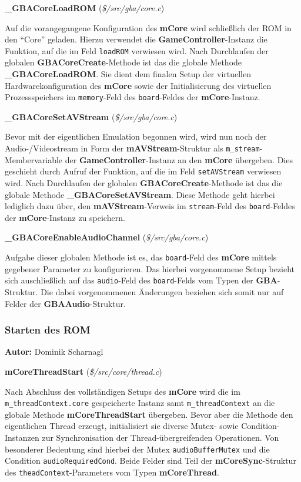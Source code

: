 \documentclass[11pt,a4paper]{scrartcl}
\newcommand{\AutorDominik} {
    \vspace{-4mm}
    \large \textbf{Autor:} Dominik Scharnagl \normalsize
    \vspace{2mm}
}
\newcommand{\paratitlecode}[2] {
    \vspace{5mm}
    \large \textbf{#1} \normalsize(\textit{\${#2}})
    \vspace{2mm}\newline
}
\begin{document}
\paratitlecode{{\_}GBACoreLoadROM}{/src/gba/core.c}
Auf die vorangegangene Konfiguration des \textbf{mCore} wird schlie{\ss}lich der ROM in den \enquote{Core} geladen. Hierzu verwendet die \textbf{GameController}-Instanz die Funktion, auf die im Feld \verb|loadROM| verwiesen wird. Nach Durchlaufen der globalen \textbf{GBACoreCreate}-Methode ist das die globale Methode \textbf{{\_}GBACoreLoadROM}. Sie dient dem finalen Setup der virtuellen Hardwarekonfiguration des \textbf{mCore} sowie der Initialisierung des virtuellen Prozessspeichers im \verb|memory|-Feld des \verb|board|-Feldes der \textbf{mCore}-Instanz.

\paratitlecode{{\_}GBACoreSetAVStream}{/src/gba/core.c}
Bevor mit der eigentlichen Emulation begonnen wird, wird nun noch der Audio-/Videostream in Form der \textbf{mAVStream}-Struktur als \verb|m_stream|-Membervariable der \textbf{GameController}-Instanz an den \textbf{mCore} \"ubergeben. Dies geschieht durch Aufruf der Funktion, auf die im Feld \verb|setAVStream| verwiesen wird. Nach Durchlaufen der globalen \textbf{GBACoreCreate}-Methode ist das die globale Methode \textbf{{\_}GBACoreSetAVStream}. Diese Methode geht hierbei lediglich dazu \"uber, den \textbf{mAVStream}-Verweis im \verb|stream|-Feld des \verb|board|-Feldes der \textbf{mCore}-Instanz zu speichern.

\paratitlecode{{\_}GBACoreEnableAudioChannel}{/src/gba/core.c}
Aufgabe dieser globalen Methode ist es, das \verb|board|-Feld des \textbf{mCore} mittels gegebener Parameter zu konfigurieren. Das hierbei vorgenommene Setup bezieht sich auschlie{\ss}lich auf das \verb|audio|-Feld des \verb|board|-Felds vom Typen der \textbf{GBA}-Struktur. Die dabei vorgenommenen \"Anderungen beziehen sich somit nur auf Felder der \textbf{GBAAudio}-Struktur.


\newpage
\subsubsection{Starten des ROM}
\AutorDominik

\paratitlecode{mCoreThreadStart}{/src/core/thread.c}
Nach Abschluss des vollst\"andigen Setups des \textbf{mCore} wird die im \verb|m_threadContext.core| gespeicherte Instanz samt \verb|m_threadContext| an die globale Methode \textbf{mCoreThreadStart} \"ubergeben. Bevor aber die Methode den eigentlichen Thread erzeugt, initialisiert sie diverse Mutex- sowie Condition-Instanzen zur Synchronisation der Thread-\"ubergreifenden Operationen. Von besonderer Bedeutung sind hierbei der Mutex \verb|audioBufferMutex| und die Condition \verb|audioRequiredCond|. Beide Felder sind Teil der \textbf{mCoreSync}-Struktur des \verb|theadContext|-Parameters vom Typen \textbf{mCoreThread}.
\end{document}
